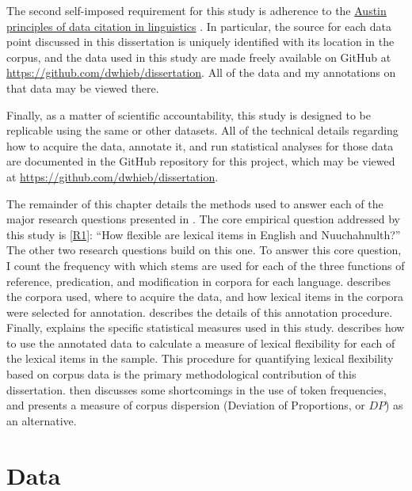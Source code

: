 The second self-imposed requirement for this study is adherence to the \href{https://site.uit.no/linguisticsdatacitation/}{Austin principles of data citation in linguistics} \parencite{BerezKroekeretal2018}. In particular, the source for each data point discussed in this dissertation is uniquely identified with its location in the corpus, and the data used in this study are made freely available on GitHub at \url{https://github.com/dwhieb/dissertation}. All of the data and my annotations on that data may be viewed there.

Finally, as a matter of scientific accountability, this study is designed to be replicable using the same or other datasets. All of the technical details regarding how to acquire the data, annotate it, and run statistical analyses for those data are documented in the GitHub repository for this project, which may be viewed at \url{https://github.com/dwhieb/dissertation}.

The remainder of this chapter details the methods used to answer each of the major research questions presented in . The core empirical question addressed by this study is \ref{R1}: \enquote{How flexible are lexical items in English and Nuuchahnulth?} The other two research questions build on this one. To answer this core question, I count the frequency with which stems are used for each of the three functions of reference, predication, and modification in corpora for each language.  describes the corpora used, where to acquire the data, and how lexical items in the corpora were selected for annotation.  describes the details of this annotation procedure. Finally,  explains the specific statistical measures used in this study.  describes how to use the annotated data to calculate a measure of lexical flexibility for each of the lexical items in the sample. This procedure for quantifying lexical flexibility based on corpus data is the primary methodological contribution of this dissertation.  then discusses some shortcomings in the use of token frequencies, and presents a measure of corpus dispersion (Deviation of Proportions, or $DP$) as an alternative.

\section{Data}
\label{sec:3.2}

